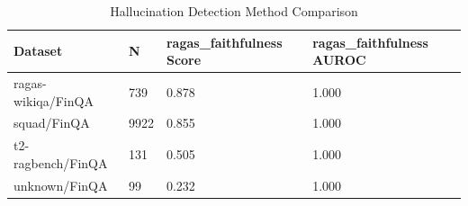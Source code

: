 \begin{table}[htbp]
\centering
\caption{Hallucination Detection Method Comparison}
\label{tab:hallucination_comparison}

\begin{tabular}{llll}
\toprule
Dataset & N & ragas_faithfulness Score & ragas_faithfulness AUROC \\
\midrule
ragas-wikiqa/FinQA & 739 & 0.878 & 1.000 \\
squad/FinQA & 9922 & 0.855 & 1.000 \\
t2-ragbench/FinQA & 131 & 0.505 & 1.000 \\
unknown/FinQA & 99 & 0.232 & 1.000 \\
\bottomrule
\end{tabular}
\end{table}